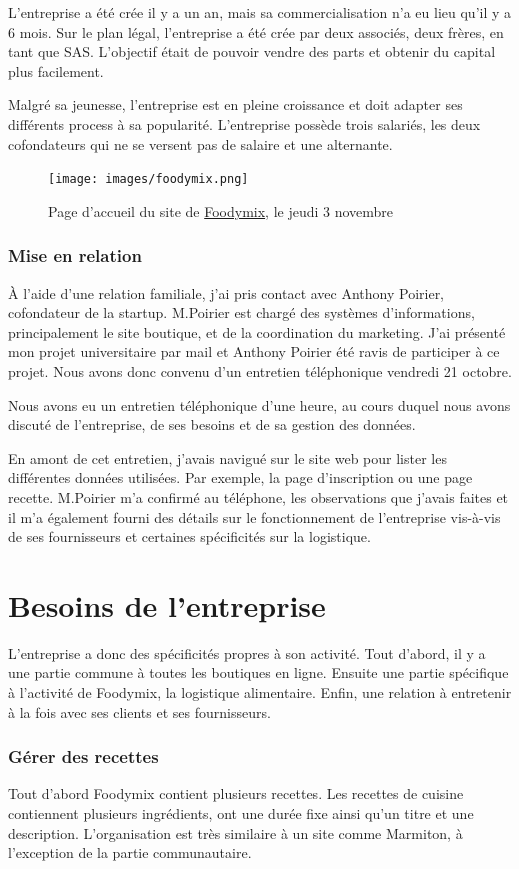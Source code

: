 \documentclass{article}
\begin{document}
L'entreprise a été crée il y a un an, mais sa commercialisation n'a eu lieu qu'il y a 6 mois. Sur le plan légal, l'entreprise a été crée par deux associés, deux frères, en tant que SAS. L'objectif était de pouvoir vendre des parts et obtenir du capital plus facilement.

Malgré sa jeunesse, l'entreprise est en pleine croissance et doit adapter ses différents process à sa popularité. L'entreprise possède trois salariés, les deux cofondateurs qui ne se versent pas de salaire et une alternante.
\begin{figure}[h]
    \centering
    \texttt{[image: images/foodymix.png]}
    \caption{Page d'accueil du site de \href{https://foodymix.fr/}{Foodymix}, le jeudi 3 novembre}
\end{figure}
\section{Mise en relation}
À l'aide d'une relation familiale, j'ai pris contact avec Anthony Poirier, cofondateur de la startup. M.Poirier est chargé des systèmes d'informations, principalement le site boutique, et de la coordination du marketing. J'ai présenté mon projet universitaire par mail et Anthony Poirier été ravis de participer à ce projet. Nous avons donc convenu d'un entretien téléphonique vendredi 21 octobre.

Nous avons eu un entretien téléphonique d'une heure, au cours duquel nous avons discuté de l'entreprise, de ses besoins et de sa gestion des données.

En amont de cet entretien, j'avais navigué sur le site web pour lister les différentes données utilisées. Par exemple, la page d'inscription ou une page recette. M.Poirier m'a confirmé au téléphone, les observations que j'avais faites et il m'a également fourni des détails sur le fonctionnement de l'entreprise vis-à-vis de ses fournisseurs et certaines spécificités sur la logistique.

\part{Besoins de l'entreprise}
\setcounter{section}{0}
L'entreprise a donc des spécificités propres à son activité. Tout d'abord, il y a une partie commune à toutes les boutiques en ligne. Ensuite une partie spécifique à l'activité de Foodymix, la logistique alimentaire. Enfin, une relation à entretenir à la fois avec ses clients et ses fournisseurs.
\section{Gérer des recettes}
Tout d'abord Foodymix contient plusieurs recettes. Les recettes de cuisine contiennent plusieurs ingrédients, ont une durée fixe ainsi qu'un titre et une description.
L'organisation est très similaire à un site comme Marmiton, à l'exception de la partie communautaire.
\end{document}
